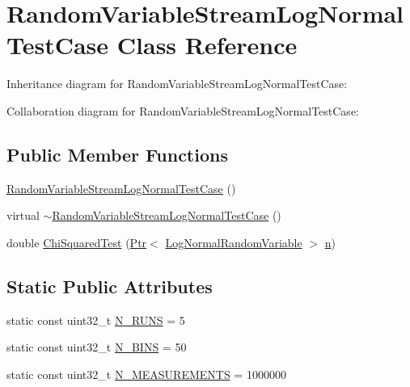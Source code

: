 \hypertarget{classRandomVariableStreamLogNormalTestCase}{}\section{Random\+Variable\+Stream\+Log\+Normal\+Test\+Case Class Reference}
\label{classRandomVariableStreamLogNormalTestCase}


Inheritance diagram for Random\+Variable\+Stream\+Log\+Normal\+Test\+Case\+:


Collaboration diagram for Random\+Variable\+Stream\+Log\+Normal\+Test\+Case\+:
\subsection*{Public Member Functions}
\begin{DoxyCompactItemize}
\item 
\hyperlink{classRandomVariableStreamLogNormalTestCase_aafb3a662c10ff893db0478cf8c635a9d}{Random\+Variable\+Stream\+Log\+Normal\+Test\+Case} ()
\item 
virtual \hyperlink{classRandomVariableStreamLogNormalTestCase_a08b767dd2f065d482a90d45447ed0b17}{$\sim$\+Random\+Variable\+Stream\+Log\+Normal\+Test\+Case} ()
\item 
double \hyperlink{classRandomVariableStreamLogNormalTestCase_a8dd5b9b1030955cee13cc718efa9f78d}{Chi\+Squared\+Test} (\hyperlink{classns3_1_1Ptr}{Ptr}$<$ \hyperlink{classns3_1_1LogNormalRandomVariable}{Log\+Normal\+Random\+Variable} $>$ \hyperlink{lte__link__budget__x2__handover__measures_8m_abdb05bc5a064cf642a06c83b3392f148}{n})
\end{DoxyCompactItemize}
\subsection*{Static Public Attributes}
\begin{DoxyCompactItemize}
\item 
static const uint32\+\_\+t \hyperlink{classRandomVariableStreamLogNormalTestCase_aa0ed975bc309cc017c914f56024fc147}{N\+\_\+\+R\+U\+NS} = 5
\item 
static const uint32\+\_\+t \hyperlink{classRandomVariableStreamLogNormalTestCase_a311c48bf6172114ca16e35c3b4c35f5a}{N\+\_\+\+B\+I\+NS} = 50
\item 
static const uint32\+\_\+t \hyperlink{classRandomVariableStreamLogNormalTestCase_a170a3082635604f00062bd8d4b0d7877}{N\+\_\+\+M\+E\+A\+S\+U\+R\+E\+M\+E\+N\+TS} = 1000000
\end{DoxyCompactItemize}
